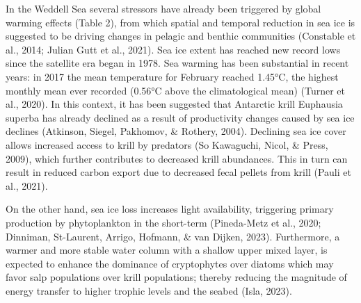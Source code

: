 \documentclass[
]{article}
\begin{document}
In the Weddell Sea several stressors have already been triggered by
global warming effects (Table 2), from which spatial and temporal
reduction in sea ice is suggested to be driving changes in pelagic and
benthic communities (Constable et al., 2014; Julian Gutt et al., 2021).
Sea ice extent has reached new record lows since the satellite era began
in 1978. Sea warming has been substantial in recent years: in 2017 the
mean temperature for February reached 1.45°C, the highest monthly mean
ever recorded (0.56°C above the climatological mean) (Turner et al.,
2020). In this context, it has been suggested that Antarctic krill
Euphausia superba has already declined as a result of productivity
changes caused by sea ice declines (Atkinson, Siegel, Pakhomov, \&
Rothery, 2004). Declining sea ice cover allows increased access to krill
by predators (So Kawaguchi, Nicol, \& Press, 2009), which further
contributes to decreased krill abundances. This in turn can result in
reduced carbon export due to decreased fecal pellets from krill (Pauli
et al., 2021).

On the other hand, sea ice loss increases light availability, triggering
primary production by phytoplankton in the short-term (Pineda-Metz et
al., 2020; Dinniman, St-Laurent, Arrigo, Hofmann, \& van Dijken, 2023).
Furthermore, a warmer and more stable water column with a shallow upper
mixed layer, is expected to enhance the dominance of cryptophytes over
diatoms which may favor salp populations over krill populations; thereby
reducing the magnitude of energy transfer to higher trophic levels and
the seabed (Isla, 2023).
\end{document}

